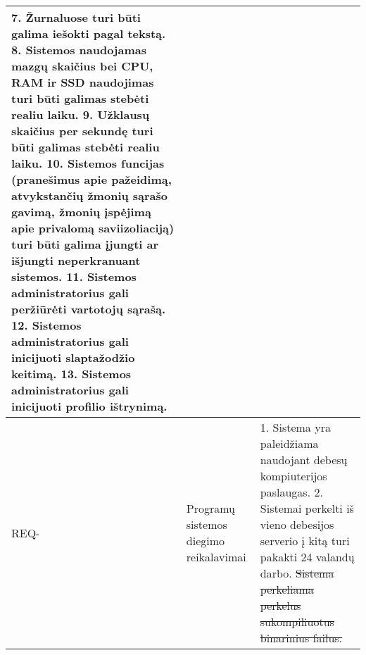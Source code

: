 \documentclass{VUMIFPSkursinis}
\newcounter{counter}
\newcommand{\reqCode}{%
	 \stepcounter{counter}%
	\color{blue} REQ-\thecounter}
\begin{document}
\begin{center}
\begin{longtable}{|C{2cm}|L{5cm}|L{8cm}|}
		{\color{blue} 7. Žurnaluose turi būti galima iešokti pagal tekstą.}                    
		{\color{blue} 8. Sistemos naudojamas mazgų skaičius bei CPU, RAM ir SSD naudojimas turi būti galimas stebėti realiu laiku.}                    
		{\color{blue} 9. Užklausų skaičius per sekundę turi būti galimas stebėti realiu laiku.}                    
		{\color{blue} 10. Sistemos funcijas (pranešimus apie pažeidimą, atvykstančių žmonių sąrašo gavimą, žmonių įspėjimą apie privalomą saviizoliaciją) turi būti galima įjungti ar išjungti neperkranuant sistemos.}                    
		{\color{blue} 11. Sistemos administratorius gali peržiūrėti vartotojų sąrašą.}                    
		{\color{blue} 12. Sistemos administratorius gali inicijuoti slaptažodžio keitimą.}                    
		{\color{blue} 13. Sistemos administratorius gali inicijuoti profilio ištrynimą.}                    
		\\ \hline
		\reqCode                                                          &
		Programų sistemos diegimo reikalavimai                            &
		{\color{blue} 1.} Sistema yra paleidžiama naudojant debesų kompiuterijos paslaugas.
		{\color{blue} 2.} Sistemai perkelti iš vieno debesijos serverio į kitą turi pakakti 24 valandų darbo.
		\sout{{\color{blue} Sistema perkeliama perkelus sukompiliuotus }} \sout{{\color{blue} binarinius failus.}}                                                                                                                                                                                                                                                                                                                                                                                                                                                                                                                                                                                                                                                                                             \\ \hline                                                                                                                                                                                                                                                                                                                                                                                                                                                                                                                                                                                                                                                                                                                          

\end{longtable}
\end{center}
\end{document}
